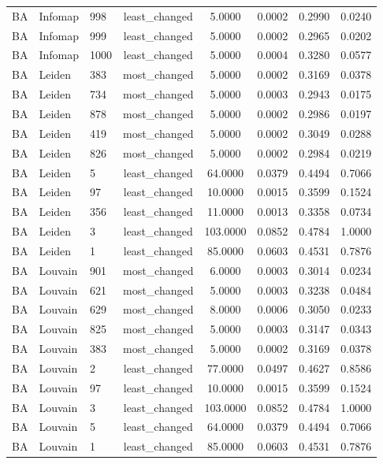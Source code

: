 \begin{longtable}{lllccccc}
BA & Infomap & 998 & least\_changed & 5.0000 & 0.0002 & 0.2990 & 0.0240 \\
BA & Infomap & 999 & least\_changed & 5.0000 & 0.0002 & 0.2965 & 0.0202 \\
BA & Infomap & 1000 & least\_changed & 5.0000 & 0.0004 & 0.3280 & 0.0577 \\
BA & Leiden & 383 & most\_changed & 5.0000 & 0.0002 & 0.3169 & 0.0378 \\
BA & Leiden & 734 & most\_changed & 5.0000 & 0.0003 & 0.2943 & 0.0175 \\
BA & Leiden & 878 & most\_changed & 5.0000 & 0.0002 & 0.2986 & 0.0197 \\
BA & Leiden & 419 & most\_changed & 5.0000 & 0.0002 & 0.3049 & 0.0288 \\
BA & Leiden & 826 & most\_changed & 5.0000 & 0.0002 & 0.2984 & 0.0219 \\
BA & Leiden & 5 & least\_changed & 64.0000 & 0.0379 & 0.4494 & 0.7066 \\
BA & Leiden & 97 & least\_changed & 10.0000 & 0.0015 & 0.3599 & 0.1524 \\
BA & Leiden & 356 & least\_changed & 11.0000 & 0.0013 & 0.3358 & 0.0734 \\
BA & Leiden & 3 & least\_changed & 103.0000 & 0.0852 & 0.4784 & 1.0000 \\
BA & Leiden & 1 & least\_changed & 85.0000 & 0.0603 & 0.4531 & 0.7876 \\
BA & Louvain & 901 & most\_changed & 6.0000 & 0.0003 & 0.3014 & 0.0234 \\
BA & Louvain & 621 & most\_changed & 5.0000 & 0.0003 & 0.3238 & 0.0484 \\
BA & Louvain & 629 & most\_changed & 8.0000 & 0.0006 & 0.3050 & 0.0233 \\
BA & Louvain & 825 & most\_changed & 5.0000 & 0.0003 & 0.3147 & 0.0343 \\
BA & Louvain & 383 & most\_changed & 5.0000 & 0.0002 & 0.3169 & 0.0378 \\
BA & Louvain & 2 & least\_changed & 77.0000 & 0.0497 & 0.4627 & 0.8586 \\
BA & Louvain & 97 & least\_changed & 10.0000 & 0.0015 & 0.3599 & 0.1524 \\
BA & Louvain & 3 & least\_changed & 103.0000 & 0.0852 & 0.4784 & 1.0000 \\
BA & Louvain & 5 & least\_changed & 64.0000 & 0.0379 & 0.4494 & 0.7066 \\
BA & Louvain & 1 & least\_changed & 85.0000 & 0.0603 & 0.4531 & 0.7876 \\

\end{longtable}
